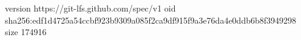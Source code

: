 version https://git-lfs.github.com/spec/v1
oid sha256:edf1d4725a54ccbf923b9309a085f2ca9df915f9a3e76da4e0ddb6b8f3949298
size 174916
